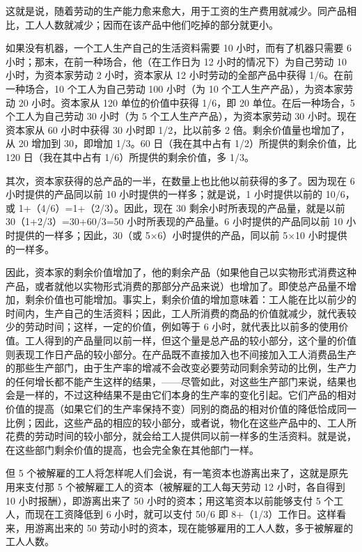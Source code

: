 这就是说，随着劳动的生产能力愈来愈大，用于工资的生产费用就减少。同产品相比，工人人数就减少；因而在该产品中他们吃掉的部分就更小。

如果没有机器，一个工人生产自己的生活资料需要 10 小时，而有了机器只需要 6 小时；那末，在前一种场合，他（在工作日为 12 小时的情况下）为自己劳动 10 小时，为资本家劳动 2 小时，资本家从 12 小时劳动的全部产品中获得 1/6。在前一种场合，10 个工人为自己劳动 100 小时（为 10 个工人生产产品），为资本家劳动 20 小时。资本家从 120 单位的价值中获得 1/6，即 20 单位。在后一种场合，5 个工人为自己劳动 30 小时（为 5 个工人生产产品），为资本家劳动 30 小时。现在资本家从 60 小时中获得 30 小时即 1/2，比以前多 2 倍。剩余价值量也增加了，从 20 增加到 30，即增加 1/3。60 日（我在其中占有 1/2）所提供的剩余价值，比 120 日（我在其中占有 1/6）所提供的剩余价值，多 1/3。

其次，资本家获得的总产品的一半，在数量上也比他以前获得的多了。因为现在 6 小时提供的产品同以前 10 小时提供的一样多；就是说，1 小时提供以前的 10/6，或 1+（4/6）=1+（2/3）。因此，现在 30 剩余小时所表现的产品量，就是以前 30（1+2/3）=30+60/3=50 小时所表现的产品量。6 小时提供的产品同以前 10 小时提供的一样多；因此，30（或 5×6）小时提供的产品，同以前 5×10 小时提供的一样多。

因此，资本家的剩余价值增加了，他的剩余产品（如果他自己以实物形式消费这种产品，或者就他以实物形式消费的那部分产品来说）也增加了。即使总产品量不增加，剩余价值也可能增加。事实上，剩余价值的增加意味着：工人能在比以前少的时间内，生产自己的生活资料；因此，工人所消费的商品的价值就减少，就代表较少的劳动时间；这样，一定的价值，例如等于 6 小时，就代表比以前多的使用价值。工人得到的产品量同以前一样，但这个量是总产品的较小部分，这个量的价值则表现工作日产品的较小部分。在产品既不直接加入也不间接加入工人消费品生产的那些生产部门，由于生产率的增减不会改变必要劳动同剩余劳动的比例，生产力的任何增长都不能产生这样的结果，——尽管如此，对这些生产部门来说，结果也会是一样的，不过这种结果不是由它们本身的生产率的变化引起。它们产品的相对价值的提高（如果它们的生产率保持不变）同别的商品的相对价值的降低恰成同一比例；因此，这些产品的相应的较小部分，或者说，物化在这些产品中的、工人所花费的劳动时间的较小部分，就会给工人提供同以前一样多的生活资料。就是说，在这些部门剩余价值的提高，也会完全象在其他部门一样。

但 5 个被解雇的工人将怎样呢人们会说，有一笔资本也游离出来了，这就是原先用来支付那 5 个被解雇工人的资本（被解雇的工人每天劳动 12 小时，各自得到 10 小时报酬），即游离出来了 50 小时的资本；用这笔资本以前能够支付 5 个工人，而现在工资降低到 6 小时，就可以支付 50/6 即 8+（1/3）工作日。这样看来，用游离出来的 50 劳动小时的资本，现在能够雇用的工人人数，多于被解雇的工人人数。


